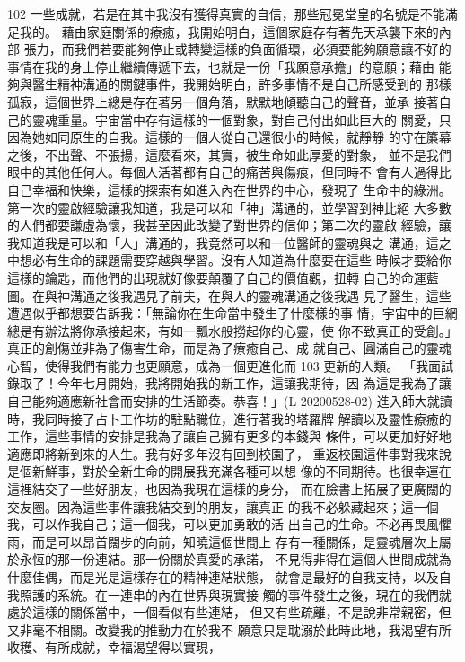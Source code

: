 102 
一些成就，若是在其中我沒有獲得真實的自信，那些冠冕堂皇的名號是不能滿
足我的。 
藉由家庭關係的療癒，我開始明白，這個家庭存有著先天承襲下來的內部
張力，而我們若要能夠停止或轉變這樣的負面循環，必須要能夠願意讓不好的
事情在我的身上停止繼續傳遞下去，也就是一份「我願意承擔」的意願；藉由
能夠與醫生精神溝通的關鍵事件，我開始明白，許多事情不是自己所感受到的
那樣孤寂，這個世界上總是存在著另一個角落，默默地傾聽自己的聲音，並承
接著自己的靈魂重量。宇宙當中存有這樣的一個對象，對自己付出如此巨大的
關愛，只因為她如同原生的自我。這樣的一個人從自己還很小的時候，就靜靜
的守在簾幕之後，不出聲、不張揚，這麼看來，其實，被生命如此厚愛的對象，
並不是我們眼中的其他任何人。每個人活著都有自己的痛苦與傷痕，但同時不
會有人過得比自己幸福和快樂，這樣的探索有如進入內在世界的中心，發現了
生命中的綠洲。 
第一次的靈啟經驗讓我知道，我是可以和「神」溝通的，並學習到神比絕
大多數的人們都要謙虛為懷，我甚至因此改變了對世界的信仰；第二次的靈啟
經驗，讓我知道我是可以和「人」溝通的，我竟然可以和一位醫師的靈魂與之
溝通，這之中想必有生命的課題需要穿越與學習。沒有人知道為什麼要在這些
時候才要給你這樣的鑰匙，而他們的出現就好像要顛覆了自己的價值觀，扭轉
自己的命運藍圖。在與神溝通之後我遇見了前夫，在與人的靈魂溝通之後我遇
見了醫生，這些遭遇似乎都想要告訴我：「無論你在生命當中發生了什麼樣的事
情，宇宙中的巨網總是有辦法將你承接起來，有如一瓢水般撈起你的心靈，使
你不致真正的受創。」真正的創傷並非為了傷害生命，而是為了療癒自己、成
就自己、圓滿自己的靈魂心智，使得我們有能力也更願意，成為一個更進化而
103 
更新的人類。 
「我面試錄取了！今年七月開始，我將開始我的新工作，這讓我期待，因
為這是我為了讓自己能夠適應新社會而安排的生活節奏。恭喜！」(L
20200528-02) 
進入師大就讀時，我同時接了占卜工作坊的駐點職位，進行著我的塔羅牌
解讀以及靈性療癒的工作，這些事情的安排是我為了讓自己擁有更多的本錢與
條件，可以更加好好地適應即將新到來的人生。我有好多年沒有回到校園了，
重返校園這件事對我來說是個新鮮事，對於全新生命的開展我充滿各種可以想
像的不同期待。也很幸運在這裡結交了一些好朋友，也因為我現在這樣的身分，
而在臉書上拓展了更廣闊的交友圈。因為這些事件讓我結交到的朋友，讓真正
的我不必躲藏起來；這一個我，可以作我自己；這一個我，可以更加勇敢的活
出自己的生命。不必再畏風懼雨，而是可以昂首闊步的向前，知曉這個世間上
存有一種關係，是靈魂層次上屬於永恆的那一份連結。那一份關於真愛的承諾，
不見得非得在這個人世間成就為什麼佳偶，而是光是這樣存在的精神連結狀態，
就會是最好的自我支持，以及自我照護的系統。在一連串的內在世界與現實接
觸的事件發生之後，現在的我們就處於這樣的關係當中，一個看似有些連結，
但又有些疏離，不是說非常親密，但又非毫不相關。改變我的推動力在於我不
願意只是耽溺於此時此地，我渴望有所收穫、有所成就，幸福渴望得以實現，
